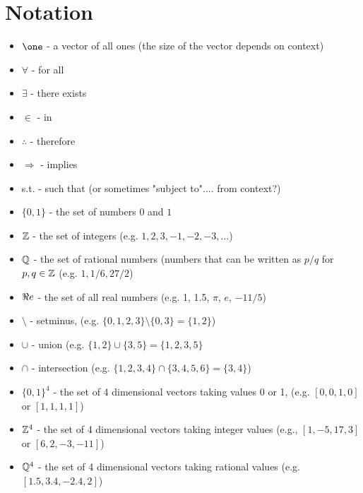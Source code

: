 %

%

\newpage
\section*{Notation}
\begin{itemize}
\item $\one$ - a vector of all ones (the size of the vector depends on context)
\item $\forall$ - for all
\item $\exists$ - there exists
\item $\in$ - in
\item $\therefore$ - therefore
\item $\Rightarrow$ - implies
\item s.t.  - such that (or sometimes "subject to".... from context?)
\item $\{0,1\}$ - the set of numbers $0$ and $1$
\item $\mathbb{Z}$ - the set of integers (e.g. $1,2,3,-1,-2,-3,...$)
\item $\mathbb{Q}$ - the set of rational numbers (numbers that can be written as $p/q$ for $p,q \in \mathbb{Z}$ (e.g. $1, 1/6, 27/2$)
\item $\Re e$  - the set of all real numbers (e.g. 1, 1.5, $\pi$, $e$, $-11/5$)
\item $\setminus$ - setminus, (e.g.  $\{0,1,2,3\} \setminus \{0,3\} = \{1,2\}$)
\item $\cup$ - union (e.g.  $\{1,2\} \cup \{3,5\} = \{1,2,3,5\}$
\item $\cap$ - intersection (e.g. $\{1,2,3,4\} \cap \{3,4,5,6\} = \{3,4\}$)
\item $\{0,1\}^4$ - the set of 4 dimensional vectors taking values 0 or 1, (e.g. $[0,0,1,0]$ or $[1,1,1,1]$)
\item $\mathbb{Z}^4$ - the set of 4 dimensional vectors taking integer values (e.g., $[1,-5,17,3]$ or $[6 , 2, -3, -11]$)
\item $\mathbb{Q}^4$ - the set of 4 dimensional vectors taking rational values (e.g. $[1.5, 3.4, -2.4, 2]$)

\end{itemize}
